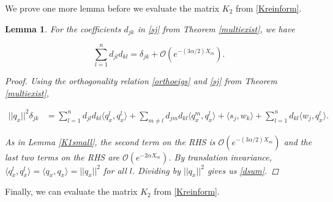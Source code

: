 \documentclass[12pt]{article}
\newtheorem{lemma}{Lemma}
\begin{document}
We prove one more lemma before we evaluate the matrix $K_2$ from \eqref{Kreinform}.


\begin{lemma}\label{orthogonald}
For the coefficients $d_{jk}$ in \eqref{sj} from Theorem \ref{multiexist}, we have

\begin{equation}\label{dsum}
\sum_{l = 1}^{n} d_{jl} d_{kl} = \delta_{jk} + \mathcal{O}(e^{-(3 \alpha/2) X_m}).
\end{equation}

\begin{proof}
Using the orthogonality relation \eqref{orthoeigs} and \eqref{sj} from Theorem \ref{multiexist},

\begin{align*}
||q_x||^2 \delta_{jk}
&= \sum_{l = 1}^{n} d_{jl} d_{kl} \langle q^l_x, q^l_{x} \rangle 
+ \sum_{m \neq l} d_{jm} d_{kl} \langle q^m_x, q^l_{x} \rangle 
+ \langle s_j, w_k \rangle 
+ \sum_{l = 1}^{n} d_{kl} \langle w_j, q^l_{x} \rangle.
\end{align*}

As in Lemma \ref{K1small}, the second term on the RHS is $\mathcal{O}(e^{-(3 \alpha/2) X_m})$ and the last two terms on the RHS are $\mathcal{O}(e^{-2 \alpha X_m})$. By translation invariance, $\langle q^l_x, q^l_{x} \rangle = \langle q_x, q_{x} \rangle = ||q_x||^2$ for all $l$. Dividing by $||q_x||^2$ gives us \eqref{dsum}.

\end{proof}
\end{lemma}

Finally, we can evaluate the matrix $K_2$ from \eqref{Kreinform}.

\end{document}
